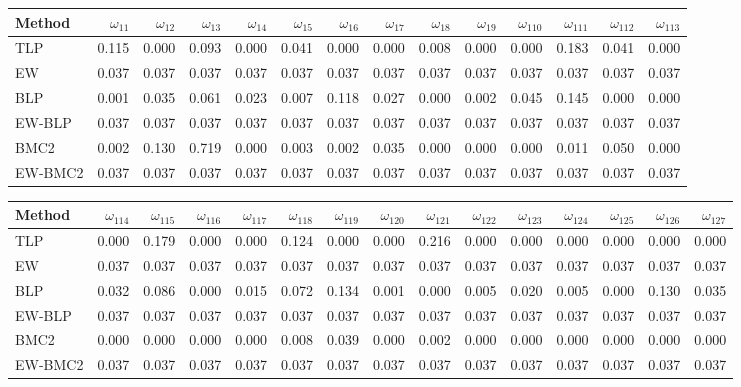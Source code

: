 \documentclass[
]{article}
\begin{document}
\begin{tabular}{lrrrrrrrrrrrrr}
\toprule
Method & $\omega_{11}$ & $\omega_{12}$ & $\omega_{13}$ & $\omega_{14}$ & $\omega_{15}$ & $\omega_{16}$ & $\omega_{17}$ & $\omega_{18}$ & $\omega_{19}$ & $\omega_{110}$ & $\omega_{111}$ & $\omega_{112}$ & $\omega_{113}$\\
\midrule
TLP & 0.115 & 0.000 & 0.093 & 0.000 & 0.041 & 0.000 & 0.000 & 0.008 & 0.000 & 0.000 & 0.183 & 0.041 & 0.000\\
EW & 0.037 & 0.037 & 0.037 & 0.037 & 0.037 & 0.037 & 0.037 & 0.037 & 0.037 & 0.037 & 0.037 & 0.037 & 0.037\\
BLP & 0.001 & 0.035 & 0.061 & 0.023 & 0.007 & 0.118 & 0.027 & 0.000 & 0.002 & 0.045 & 0.145 & 0.000 & 0.000\\
EW-BLP & 0.037 & 0.037 & 0.037 & 0.037 & 0.037 & 0.037 & 0.037 & 0.037 & 0.037 & 0.037 & 0.037 & 0.037 & 0.037\\
BMC2 & 0.002 & 0.130 & 0.719 & 0.000 & 0.003 & 0.002 & 0.035 & 0.000 & 0.000 & 0.000 & 0.011 & 0.050 & 0.000\\
EW-BMC2 & 0.037 & 0.037 & 0.037 & 0.037 & 0.037 & 0.037 & 0.037 & 0.037 & 0.037 & 0.037 & 0.037 & 0.037 & 0.037\\
\bottomrule
\end{tabular}

\begin{tabular}{lrrrrrrrrrrrrrr}
\toprule
Method & $\omega_{114}$ & $\omega_{115}$ & $\omega_{116}$ & $\omega_{117}$ & $\omega_{118}$ & $\omega_{119}$ & $\omega_{120}$ & $\omega_{121}$ & $\omega_{122}$ & $\omega_{123}$ & $\omega_{124}$ & $\omega_{125}$ & $\omega_{126}$ & $\omega_{127}$\\
\midrule
TLP & 0.000 & 0.179 & 0.000 & 0.000 & 0.124 & 0.000 & 0.000 & 0.216 & 0.000 & 0.000 & 0.000 & 0.000 & 0.000 & 0.000\\
EW & 0.037 & 0.037 & 0.037 & 0.037 & 0.037 & 0.037 & 0.037 & 0.037 & 0.037 & 0.037 & 0.037 & 0.037 & 0.037 & 0.037\\
BLP & 0.032 & 0.086 & 0.000 & 0.015 & 0.072 & 0.134 & 0.001 & 0.000 & 0.005 & 0.020 & 0.005 & 0.000 & 0.130 & 0.035\\
EW-BLP & 0.037 & 0.037 & 0.037 & 0.037 & 0.037 & 0.037 & 0.037 & 0.037 & 0.037 & 0.037 & 0.037 & 0.037 & 0.037 & 0.037\\
BMC2 & 0.000 & 0.000 & 0.000 & 0.000 & 0.008 & 0.039 & 0.000 & 0.002 & 0.000 & 0.000 & 0.000 & 0.000 & 0.000 & 0.000\\
EW-BMC2 & 0.037 & 0.037 & 0.037 & 0.037 & 0.037 & 0.037 & 0.037 & 0.037 & 0.037 & 0.037 & 0.037 & 0.037 & 0.037 & 0.037\\
\bottomrule
\end{tabular}
\end{document}
